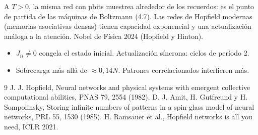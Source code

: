 \documentclass[11pt,a4paper]{article}
\begin{document}
\begin{aplicacion}
A $T>0$, la misma red con pbits muestrea alrededor de los recuerdos: es el punto de partida de las máquinas de Boltzmann (4.7). Las redes de Hopfield
modernas (memorias asociativas densas) tienen capacidad exponencial y una actualización análoga a la atención. Nobel de Física 2024 (Hopfield y Hinton).
\end{aplicacion}

\begin{error}
\begin{itemize}[nosep]
\item $J_{ii}\neq0$ congela el estado inicial. \quad Actualización síncrona: ciclos de período 2.
\item Sobrecarga más allá de $\approx0{,}14N$. \quad Patrones correlacionados interfieren más.
\end{itemize}
\end{error}

\begin{thebibliography}{9}\small
{} J. J. Hopfield, Neural networks and physical systems with emergent collective computational abilities, PNAS 79, 2554 (1982).
 D. J. Amit, H. Gutfreund y H. Sompolinsky, Storing infinite numbers of patterns in a spin-glass model of neural networks, PRL 55, 1530 (1985).
 H. Ramsauer et al., Hopfield networks is all you need, ICLR 2021.
\end{thebibliography}
\end{document}
